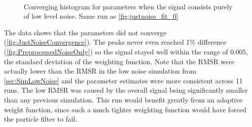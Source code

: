 \begin{figure}[H]
\centering
{}\\
\end{figure}

\begin{figure}[H]
\centering
{}
\caption{Converging histogram for parameters when the signal consists purely of low level noise.
Same run as \autoref{fig:justnoise_fit_0}}
\label{fig:JustNoiseConvergence}
\end{figure}

The data shows that the parameters did not converge
(\autoref{fig:JustNoiseConvergence}).
The peaks never even reached 1\% difference
(\autoref{fig:PreprocessedNoiseOnly}) so  the signal  stayed
well within the range of $0.005$, the standard deviation of the weighting function.
Note that the \acs{RMSR}
were actually lower than the \acs{RMSR} in the low noise simulation 
from \autoref{sec:SimLowNoise}
and the parameter estimates were more consistent across 11 runs.
The low \ac{RMSR} was caused by the overall
signal being significantly smaller than any previous simulation.
This run would benefit greatly from an adaptive weight function, since
such a much tighter weighting function would have forced the particle
filter to fail.

